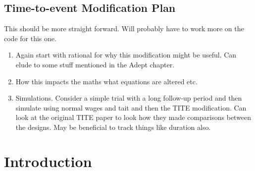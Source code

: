 \subsection{Time-to-event Modification Plan}
This should be more straight forward. Will probably have to work more on the code for this one. 

\begin{enumerate}
	\item Again start with rational for why this modification might be useful. Can elude to some stuff mentioned in the Adept chapter. 
	\item How this impacts the maths what equations are altered etc. 
	\item Simulations. Consider a simple trial with a long follow-up period and then simulate using normal wages and tait and then the TITE modification. Can look at the original TITE paper to look how they made comparisons between the designs. May be beneficial to track things like duration also. 
\end{enumerate}



\section{Introduction}

